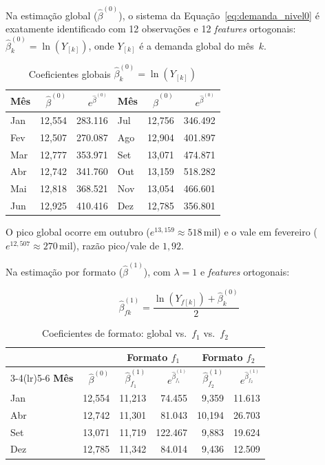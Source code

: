 \documentclass[fleqn,12pt,a4paper]{article}
\begin{document}
Na estimação global ($\hat{\beta}^{(0)}$), o sistema da Equação~\eqref{eq:demanda_nivel0}
é exatamente identificado com 12 observações e 12 \textit{features} ortogonais:
$\hat{\beta}^{(0)}_k = \ln(Y_{[k]})$, onde $Y_{[k]}$ é a demanda global do mês~$k$.

\begin{table}[ht]
\centering
\small
\caption{Coeficientes globais $\hat{\beta}^{(0)}_k = \ln(Y_{[k]})$}
\label{tab:beta0}
\begin{tabular}{lrr|lrr}
\toprule
\textbf{Mês} & $\hat{\beta}^{(0)}$ & $e^{\hat{\beta}^{(0)}}$
& \textbf{Mês} & $\hat{\beta}^{(0)}$ & $e^{\hat{\beta}^{(0)}}$ \\
\midrule
Jan & 12,554 & 283.116 & Jul & 12,756 & 346.492 \\
Fev & 12,507 & 270.087 & Ago & 12,904 & 401.897 \\
Mar & 12,777 & 353.971 & Set & 13,071 & 474.871 \\
Abr & 12,742 & 341.760 & Out & 13,159 & 518.282 \\
Mai & 12,818 & 368.521 & Nov & 13,054 & 466.601 \\
Jun & 12,925 & 410.416 & Dez & 12,785 & 356.801 \\
\bottomrule
\end{tabular}
\end{table}

O pico global ocorre em outubro ($e^{13{,}159} \approx 518\,\text{mil}$) e o vale em
fevereiro ($e^{12{,}507} \approx 270\,\text{mil}$), razão pico/vale de $1{,}92$.

Na estimação por formato ($\hat{\beta}^{(1)}$), com $\lambda = 1$ e \textit{features} ortogonais:
\begin{ceqn}
\begin{equation*}
\hat{\beta}^{(1)}_{fk} = \frac{\ln(Y_{f[k]}) + \hat{\beta}^{(0)}_k}{2}
\end{equation*}
\end{ceqn}

\begin{table}[ht]
\centering
\small
\caption{Coeficientes de formato: global vs.\ $f_1$ vs.\ $f_2$}
\label{tab:beta1}
\begin{tabular}{lrrrrr}
\toprule
 & & \multicolumn{2}{c}{\textbf{Formato $f_1$}} & \multicolumn{2}{c}{\textbf{Formato $f_2$}} \\
\cmidrule(lr){3-4}\cmidrule(lr){5-6}
\textbf{Mês} & $\hat{\beta}^{(0)}$
             & $\hat{\beta}^{(1)}_{f_1}$ & $e^{\hat{\beta}^{(1)}_{f_1}}$
             & $\hat{\beta}^{(1)}_{f_2}$ & $e^{\hat{\beta}^{(1)}_{f_2}}$ \\
\midrule
Jan & 12,554 & 11,213 &  74.455 &  9,359 &  11.613 \\
Abr & 12,742 & 11,301 &  81.043 & 10,194 &  26.703 \\
Set & 13,071 & 11,719 & 122.467 &  9,883 &  19.624 \\
Dez & 12,785 & 11,342 &  84.014 &  9,436 &  12.509 \\
\bottomrule
\end{tabular}
\end{table}
\end{document}
